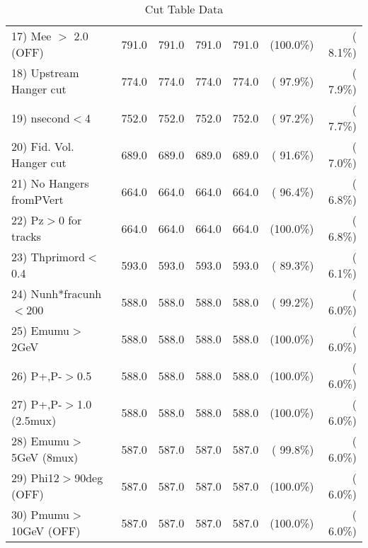 \begin{table}[h!]
\begin{tabular}{||l||r|r|r|r|r|r||}
 17) Mee $>$ 2.0  (OFF)   &        791.0 &        791.0 &        791.0 &        791.0 & (100.0\%) & (  8.1\%) \\
 18) Upstream Hanger cut  &        774.0 &        774.0 &        774.0 &        774.0 & ( 97.9\%) & (  7.9\%) \\
 19) nsecond$<$4          &        752.0 &        752.0 &        752.0 &        752.0 & ( 97.2\%) & (  7.7\%) \\
 20) Fid. Vol. Hanger cut &        689.0 &        689.0 &        689.0 &        689.0 & ( 91.6\%) & (  7.0\%) \\
 21) No Hangers fromPVert &        664.0 &        664.0 &        664.0 &        664.0 & ( 96.4\%) & (  6.8\%) \\
 22) Pz$>$0 for tracks    &        664.0 &        664.0 &        664.0 &        664.0 & (100.0\%) & (  6.8\%) \\
 23) Thprimord$<$0.4      &        593.0 &        593.0 &        593.0 &        593.0 & ( 89.3\%) & (  6.1\%) \\
 24) Nunh*fracunh$<$200   &        588.0 &        588.0 &        588.0 &        588.0 & ( 99.2\%) & (  6.0\%) \\
 25) Emumu$>$2GeV         &        588.0 &        588.0 &        588.0 &        588.0 & (100.0\%) & (  6.0\%) \\
 26) P+,P-$>$0.5          &        588.0 &        588.0 &        588.0 &        588.0 & (100.0\%) & (  6.0\%) \\
 27) P+,P-$>$1.0 (2.5mux) &        588.0 &        588.0 &        588.0 &        588.0 & (100.0\%) & (  6.0\%) \\
 28) Emumu$>$5GeV  (8mux) &        587.0 &        587.0 &        587.0 &        587.0 & ( 99.8\%) & (  6.0\%) \\
 29) Phi12$>$90deg  (OFF) &        587.0 &        587.0 &        587.0 &        587.0 & (100.0\%) & (  6.0\%) \\
 30) Pmumu$>$10GeV  (OFF) &        587.0 &        587.0 &        587.0 &        587.0 & (100.0\%) & (  6.0\%) \\
 \hline
 \hline
 \end{tabular}
 \caption{Cut Table  Data     }
 \label{tab-cutcohjpsi-mumu_data}
 \end{table}
